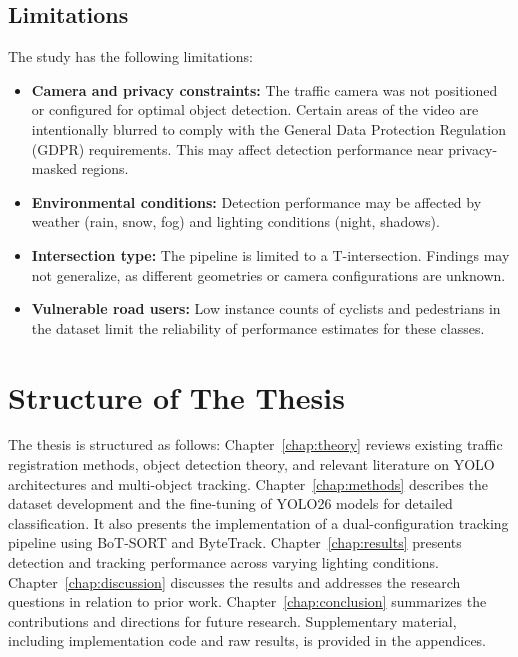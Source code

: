 \subsection*{Limitations}

The study has the following limitations:

\begin{itemize}

    \item \textbf{Camera and privacy constraints:} The traffic camera was not positioned or configured for optimal object detection. Certain areas of the video are intentionally blurred to comply with the General Data Protection Regulation (GDPR) requirements. This may affect detection performance near privacy-masked regions. 
    
    
    \item \textbf{Environmental conditions:} Detection performance may be affected by weather (rain, snow, fog) and lighting conditions (night, shadows).

    \item \textbf{Intersection type:} The pipeline is limited to a T-intersection. Findings may not generalize, as different geometries or camera configurations are unknown.


    \item \textbf{Vulnerable road users:} Low instance counts of cyclists and pedestrians in the dataset limit the reliability of performance estimates for these classes.
    
    
\end{itemize}


\section{Structure of The Thesis}
The thesis is structured as follows: Chapter~\ref{chap:theory} reviews existing traffic registration methods, object detection theory, and relevant literature on YOLO architectures and multi-object tracking. Chapter~\ref{chap:methods} describes the dataset development and the fine-tuning of YOLO26 models for detailed classification. It also presents the implementation of a dual-configuration tracking pipeline using BoT-SORT and ByteTrack. Chapter~\ref{chap:results} presents detection and tracking performance across varying lighting conditions. Chapter~\ref{chap:discussion} discusses the results and addresses the research questions in relation to prior work. Chapter~\ref{chap:conclusion} summarizes the contributions and directions for future research. Supplementary material, including implementation code and raw results, is provided in the appendices.
